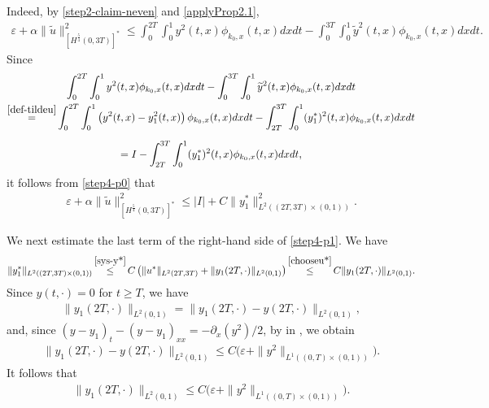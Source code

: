 \documentclass[11pt, reqno]{amsart}
\newcommand{\eps}{\varepsilon}
\newcommand{\ty}{\widetilde{y}}
\newcommand{\tu}{\widetilde{u}}
\theoremstyle{plain}
\numberwithin{equation}{section}
\begin{document}
Indeed, by \eqref{step2-claim-neven} and  \eqref{applyProp2.1}, 
\begin{align}	 \label{step4-p0}
\varepsilon + \alpha \|\tu \|_{[H^{\frac{5}{4}}(0, 3T)]^*}^2 \leq \int_0^{2T} \int_0^1 y^2(t, x) \phi_{k_0, x}(t, x) dx dt -   \int_{0}^{3T} \int_0^1 \ty^2(t, x) \phi_{k_0, x}(t, x)  dx dt.
\end{align}          
      Since
        \begin{multline*}
        		\int_0^{2T} \int_0^1 y^2(t, x) \phi_{k_0, x}(t, x) dx dt -   \int_{0}^{3T} \int_0^1 \ty^2(t, x) \phi_{k_0, x}(t, x)  dx dt \\
        		\mathop{=}^{\eqref{def-tildeu}} \int_0^{2T} \int_0^1 \left(y^2(t, x) - y_1^2(t, x)\right) \phi_{k_0, x}(t, x) dx dt  - \int_{2T}^{3T} \int_0^1 (y_1^*)^2(t, x) \phi_{k_0, x}(t, x) dx dt \\[6pt]
		= I - \int_{2T}^{3T} \int_0^1 (y_1^*)^2(t, x) \phi_{k_0, x}(t, x) dx dt, 
        \end{multline*}   
it follows from \eqref{step4-p0} that
\begin{align}
\label{step4-p1}
\varepsilon + \alpha \|\tu \|_{[H^{\frac{5}{4}}(0, 3T)]^*}^2 \leq   \left|I \right| + C \|y_1^* \|_{L^2((2T, 3T) \times (0, 1))}^2. 
\end{align}

We next estimate the last term of the right-hand side of \eqref{step4-p1}.  We have
\begin{align}	\label{step4-p3}
	\|y_1^*\|_{L^2((2T, 3T) \times (0, 1))}  \mathop{\leq}^{\eqref{sys-y*}} C \left( \|u^*\|_{L^2(2T, 3T)} + \|y_1(2T, \cdot) \|_{L^2(0, 1)} \right)  \mathop{\leq}^{\eqref{chooseu*}} C \|y_1(2T, \cdot) \|_{L^2(0, 1)}.
\end{align}
Since $y(t, \cdot)= 0$ for $t\ge T$, we have
\begin{align*} %
\| y_1(2T, \cdot)  \|_{L^2(0, 1)} = \| y_1(2T, \cdot)  - y(2T, \cdot) \|_{L^2(0, 1)}, 
\end{align*}
and, since $(y - y_1)_t - (y - y_1)_{xx} = -\partial_x(y^2)/2$, by  in , we obtain
\begin{align*} %
\| y_1(2T, \cdot)  - y(2T, \cdot) \|_{L^2(0, 1)} \le  C \Big( \eps + \| y^2\|_{L^1((0, T) \times (0, 1))}  \Big). 
\end{align*}
It follows that 
\begin{align}  \label{step4-p4}
\| y_1(2T, \cdot)  \|_{L^2(0, 1)} \le C \Big( \eps + \| y^2\|_{L^1((0, T) \times (0, 1))}  \Big). 
\end{align}
   
\end{document}

